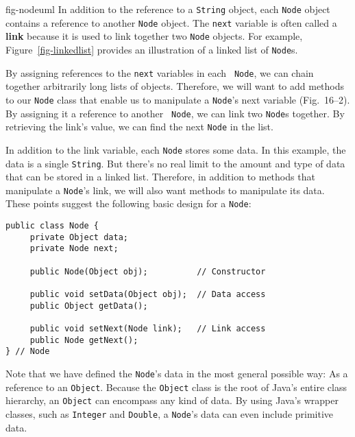  {fig-nodeuml}
\noindent In addition to the reference to a {\tt String} object, each
{\tt Node} object contains a reference to another {\tt Node} object.
The {\tt next} variable is often called a {\bf link}
because it is used to link together two {\tt Node} objects.  For
example, Figure~\ref{fig-linkedlist} provides an illustration of a
linked list of {\tt Node}s.

By assigning references to the {\tt next} variables in each {\tt
Node}, we can chain together arbitrarily long lists of objects.
Therefore, we will want to add methods to our {\tt Node} class that
enable us to manipulate a {\tt Node}'s next variable
(Fig.~16--2).  By assigning it a reference to another {\tt
Node}, we can link two {\tt Node}s together.  By retrieving the
link's value, we can find the next {\tt Node} in the list.


\noindent In addition to the link variable, each {\tt Node} stores
some data.  In this example, the data is a single {\tt String}. But
there's no real limit to the amount and type of data that can be
stored in a linked list.  Therefore, in addition to methods that
manipulate a {\tt Node}'s link, we will also want methods to
manipulate its data.  These points suggest the following basic design
for a {\tt Node}:


\begin{jjjlisting}
\begin{lstlisting}
public class Node {
     private Object data;
     private Node next;

     public Node(Object obj);          // Constructor

     public void setData(Object obj);  // Data access
     public Object getData();

     public void setNext(Node link);   // Link access
     public Node getNext();
} // Node
\end{lstlisting}
\end{jjjlisting}


\noindent Note that we have defined the {\tt Node}'s data in the
most general possible way: As a reference to an {\tt Object}.  Because
the {\tt Object} class is the root of Java's entire class hierarchy,
an {\tt Object} can encompass any kind of data.  By using Java's
wrapper classes, such as {\tt Integer} and {\tt Double}, a
{\tt Node}'s data can even include primitive data.

